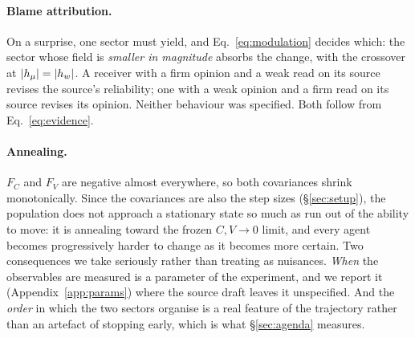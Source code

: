 \paragraph{Blame attribution.} On a surprise, one sector must yield, and
Eq.~\ref{eq:modulation} decides which: the sector whose field is \emph{smaller in
magnitude} absorbs the change, with the crossover at $|h_{\mu}| = |h_{w}|$. A receiver
with a firm opinion and a weak read on its source revises the source's
reliability; one with a weak opinion and a firm read on its source revises its
opinion. Neither behaviour was specified. Both follow from Eq.~\ref{eq:evidence}.

\paragraph{Annealing.} $F_C$ and $F_V$ are negative almost everywhere, so both
covariances shrink monotonically. Since the covariances are also the step sizes
(\S\ref{sec:setup}), the population does not approach a stationary state so much
as run out of the ability to move: it is annealing toward the frozen
$C, V \to 0$ limit, and every agent becomes progressively harder to change as it
becomes more certain. Two consequences we take seriously rather than treating as
nuisances. \emph{When} the observables are measured is a parameter of the
experiment, and we report it (Appendix~\ref{app:params}) where the source draft
leaves it unspecified. And the \emph{order} in which the two sectors organise is
a real feature of the trajectory rather than an artefact of stopping early, which
is what \S\ref{sec:agenda} measures.

